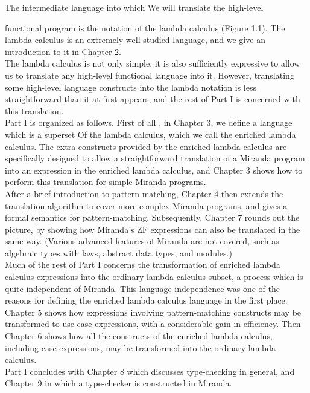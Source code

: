 \documentclass[11pt,a4paper]{book}
\begin{document}
The intermediate language into which We will translate the high-level 
\newpage
 
\noindent functional program is the notation of the lambda calculus (Figure 1.1). The 
lambda calculus is an extremely well-studied language, and we give an 
introduction to it in Chapter 2.\\

The lambda calculus is not only simple, it is also sufficiently expressive to 
allow us to translate any high-level functional language into it. However, 
translating some high-level language constructs into the lambda notation is 
less straightforward than it at first appears, and the rest of Part I is concerned 
with this translation. \\

Part I is organized as follows. First of all , in Chapter 3, we define a language 
which is a superset Of the lambda calculus, which we call the enriched lambda 
calculus. The extra constructs provided by the enriched lambda calculus are 
specifically designed to allow a straightforward translation of a Miranda 
program into an expression in the enriched lambda calculus, and Chapter 3 
shows how to perform this translation for simple Miranda programs.\\

After a brief introduction to pattern-matching, Chapter 4 then extends the 
translation algorithm to cover more complex Miranda programs, and gives a 
formal semantics for pattern-matching. Subsequently, Chapter 7 rounds out 
the picture, by showing how Miranda's ZF expressions can also be translated 
in the same way. (Various advanced features of Miranda are not covered, 
such as algebraic types with laws, abstract data types, and modules.)\\

Much of the rest of Part I concerns the transformation of enriched lambda 
calculus expressions into the ordinary lambda calculus subset, a process which 
is quite independent of Miranda. This language-independence was one of the 
reasons for defining the enriched lambda calculus language in the first place.\\

Chapter 5 shows how expressions involving pattern-matching constructs may 
be transformed to use case-expressions, with a considerable gain in efficiency. 
Then Chapter 6 shows how all the constructs of the enriched lambda calculus, 
including case-expressions, may be transformed into the ordinary lambda 
calculus.\\

Part I concludes with Chapter 8 which discusses type-checking in general, 
and Chapter 9 in which a type-checker is constructed in Miranda. 
\end{document}
